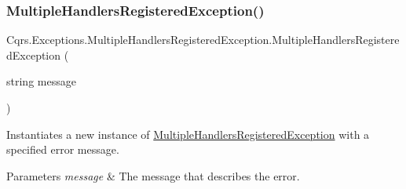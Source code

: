 \subsubsection{\texorpdfstring{Multiple\+Handlers\+Registered\+Exception()}{MultipleHandlersRegisteredException()}\hspace{0.1cm}{\footnotesize\ttfamily [2/2]}}
{\footnotesize\ttfamily Cqrs.\+Exceptions.\+Multiple\+Handlers\+Registered\+Exception.\+Multiple\+Handlers\+Registered\+Exception (\begin{DoxyParamCaption}\item[{string}]{message }\end{DoxyParamCaption})\hspace{0.3cm}{\ttfamily [protected]}}



Instantiates a new instance of \hyperlink{classCqrs_1_1Exceptions_1_1MultipleHandlersRegisteredException}{Multiple\+Handlers\+Registered\+Exception} with a specified error message. 


\begin{DoxyParams}{Parameters}
{\em message} & The message that describes the error.\\
\hline
\end{DoxyParams}
